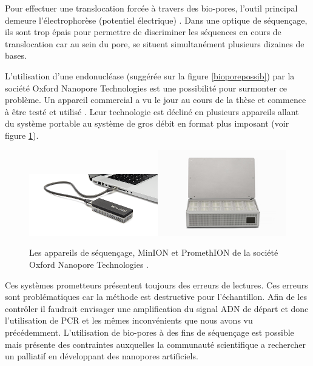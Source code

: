 Pour effectuer une translocation forcée à travers des bio-pores, l'outil principal demeure l'électrophorèse (potentiel électrique) \cite{Kasianowicz1996,Henrickson2000}. 
Dans une optique de séquençage, ils sont trop épais pour permettre de discriminer les séquences en cours de translocation car au sein du pore, se situent simultanément plusieurs dizaines de bases.

 L'utilisation d'une endonucléase (suggérée sur la figure \ref{bioporepossib}) par la société Oxford Nanopore Technologies est une possibilité pour surmonter ce problème. Un appareil commercial a vu le jour au cours de la thèse \cite{Mikheyev2014} et commence à être testé et utilisé \cite{Goodwin2015,Jain2015,Urban2015}. Leur technologie est décliné en plusieurs appareils allant du système portable au système de gros débit en format plus imposant \cite{oxfordnanopore} (voir figure \ref{oxfordnanopore}). 


\begin{figure}[h!]
\begin{center}

\includegraphics[width=0.5\textwidth]{MinION-Nanopore-technologies.png}\includegraphics[width=0.5\textwidth]{PromethION-setup.jpg}

\caption[Séquenceur MinION]{Les appareils de séquençage, MinION et PromethION
de la société Oxford Nanopore Technologies \cite{oxfordnanopore}.}
\label{oxfordnanopore}

\end{center}
\end{figure}

Ces systèmes prometteurs présentent toujours des erreurs de lectures. Ces erreurs sont problématiques car la méthode est destructive pour l'échantillon. Afin de les contrôler il faudrait envisager une amplification du signal ADN de départ et donc l’utilisation de PCR et les mêmes inconvénients que nous avons vu précédemment. L'utilisation de bio-pores à des fins de séquençage est possible mais présente des contraintes auxquelles la communauté scientifique a rechercher un palliatif en développant des nanopores artificiels.



